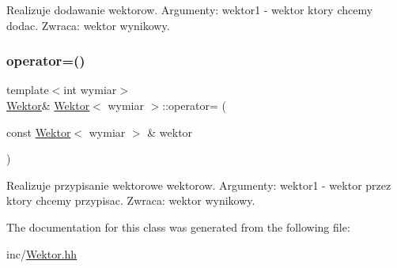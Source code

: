 Realizuje dodawanie wektorow. Argumenty\+: wektor1 -\/ wektor ktory chcemy dodac. Zwraca\+: wektor wynikowy. \mbox{\label{class_wektor_acb74d69394c482fbcda11f58f1327a39}} 
\subsubsection{\texorpdfstring{operator=()}{operator=()}}
{\footnotesize\ttfamily template$<$int wymiar$>$ \\
\mbox{\hyperlink{class_wektor}{Wektor}}\& \mbox{\hyperlink{class_wektor}{Wektor}}$<$ wymiar $>$\+::operator= (\begin{DoxyParamCaption}\item[{const \mbox{\hyperlink{class_wektor}{Wektor}}$<$ wymiar $>$ \&}]{wektor }\end{DoxyParamCaption})\hspace{0.3cm}{\ttfamily [inline]}}

Realizuje przypisanie wektorowe wektorow. Argumenty\+: wektor1 -\/ wektor przez ktory chcemy przypisac. Zwraca\+: wektor wynikowy. 

The documentation for this class was generated from the following file\+:\begin{DoxyCompactItemize}
\item 
inc/\mbox{\hyperlink{_wektor_8hh}{Wektor.\+hh}}\end{DoxyCompactItemize}
